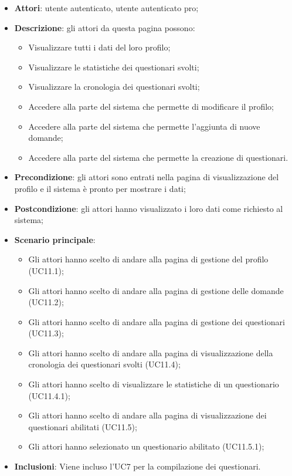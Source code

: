 \begin{itemize}
\item\textbf{Attori}: utente autenticato, utente autenticato pro;
\item\textbf{Descrizione}: gli attori da questa pagina possono: 
\begin{itemize}
	\item Visualizzare tutti i dati del loro profilo;
	\item Visualizzare le statistiche dei questionari svolti;
	\item Visualizzare la cronologia dei questionari svolti;
	\item Accedere alla parte del sistema che permette di modificare il profilo;
	\item Accedere alla parte del sistema che permette l'aggiunta di nuove domande;
	\item Accedere alla parte del sistema che permette la creazione di questionari.
\end{itemize}
\item\textbf{Precondizione}: gli attori sono entrati nella pagina di visualizzazione del profilo e il sistema è pronto per mostrare i dati;
\item\textbf{Postcondizione}: gli attori hanno visualizzato i loro dati come richiesto al sistema;
\item\textbf{Scenario principale}:
\begin{itemize}
\item Gli attori hanno scelto di andare alla pagina di gestione del profilo (UC11.1);
\item Gli attori hanno scelto di andare alla pagina di gestione delle domande (UC11.2);  
\item Gli attori hanno scelto di andare alla pagina di gestione dei questionari (UC11.3);
\item Gli attori hanno scelto di andare alla pagina di visualizzazione della cronologia dei questionari svolti (UC11.4);
\item Gli attori hanno scelto di visualizzare le statistiche di un questionario (UC11.4.1);
\item Gli attori hanno scelto di andare alla pagina di visualizzazione dei questionari abilitati (UC11.5);
\item Gli attori hanno selezionato un questionario abilitato (UC11.5.1);
\end{itemize}
\item\textbf{Inclusioni}: Viene incluso l'UC7 per la compilazione dei questionari.
\end{itemize}

